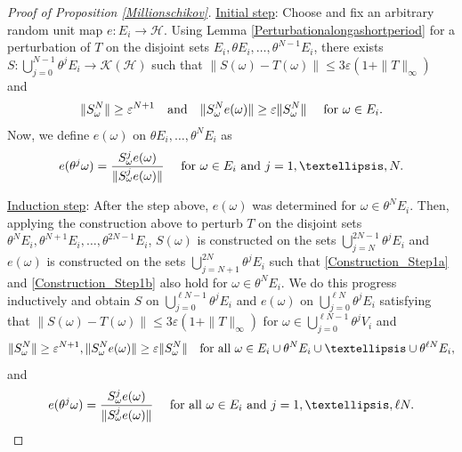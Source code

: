 \documentclass[10pt,a4paper]{amsart}
\newcommand{\cH}{\mathcal{H}}
\newcommand{\eps}{\varepsilon}
\begin{document}
\begin{proof}[Proof of Proposition \ref{Millionschikov}]
\noindent 
\underline{Initial step}: Choose and fix an arbitrary random unit map $e:E_i\rightarrow \cH$. Using Lemma \ref{Perturbationalongashortperiod} for a perturbation of $T$ on the disjoint sets $E_i,\theta E_i,\dots,\theta^{N-1}E_i$, there exists $S:\bigcup_{j=0}^{N-1} \theta^j E_i\rightarrow \mathcal K(\cH)$ such that $\|S(\omega)-T(\omega)\|\leq 3\eps (1+\|T\|_{\infty})$ and 
\begin{equation}\label{Construction_Step1a}
\|S_{\omega}^N\|\geq \eps^{N+1}\quad\hbox{and}\quad  \|S_{\omega}^Ne(\omega)\|\geq \eps \|S_{\omega}^N\|\quad \hbox{ for } \omega \in E_i.
\end{equation}
Now, we define $e(\omega)$ on $\theta E_i,\dots,\theta^N E_i$ as 
\begin{equation}\label{Construction_Step1b}
e(\theta^{j}\omega)=\frac{S^{j}_{\omega}e(\omega)}{\|S^j_{\omega}e(\omega)\|}\quad \hbox{ for } \omega \in E_i \hbox{ and } j=1,\dots, N.
\end{equation}

\noindent 
\underline{Induction step}: After the step above, $e(\omega)$ was determined for $\omega\in \theta^N E_i$. Then, applying the construction above to perturb $T$ on the disjoint sets $\theta^{N}E_i,\theta^{N+1}E_i,\dots,\theta^{2N-1}E_i$, $S(\omega)$ is constructed on the sets $\bigcup_{j=N}^{2N-1}\theta^j E_i$ and $e(\omega)$ is constructed on the sets   $\bigcup_{j=N+1}^{2N}\theta^j E_i$ such that \eqref{Construction_Step1a} and \eqref{Construction_Step1b} also hold for $\omega\in \theta^N E_i$. We do this progress inductively and obtain $S$ on $\bigcup_{j=0}^{\ell N-1} \theta^j E_i$ and $e(\omega)$ on $\bigcup_{j=0}^{\ell N} \theta^j E_i$ satisfying that $\|S(\omega)-T(\omega)\|\leq 3\eps(1+ \|T\|_{\infty})$ for  $\omega\in \bigcup_{j=0}^{\ell N-1}\theta^j V_i$ and 
\begin{equation}
\|S_{\omega}^N\|\geq \eps^{N+1}, \|S_{\omega}^Ne(\omega)\|
\geq  \eps \|S_{\omega}^N\|\quad \hbox{for all } \omega \in E_i\cup \theta^N E_i\cup\dots\cup\theta^{\ell N} E_i\label{Nstepnorm},
\end{equation}
and
\begin{equation}\label{Invariance_InductionStep}
e(\theta^j\omega)
=
\frac{S^{j}_{\omega}e(\omega)}{\|S^j_{\omega}e(\omega)\|}\quad \hbox{ for all } \omega \in E_i \hbox{ and } j=1,\dots, \ell N.
\end{equation} 


\end{proof}
\end{document}

